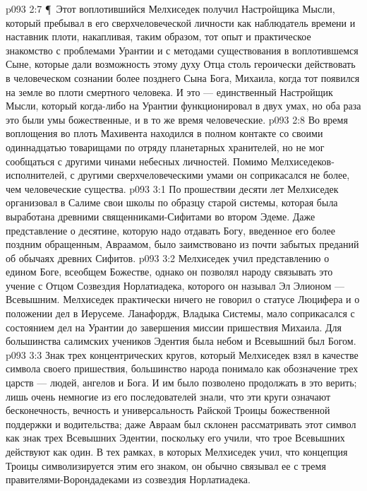 \vs p093 2:7 \P\ Этот воплотившийся Мелхиседек получил Настройщика Мысли, который пребывал в его сверхчеловеческой личности как наблюдатель времени и наставник плоти, накапливая, таким образом, тот опыт и практическое знакомство с проблемами Урантии и с методами существования в воплотившемся Сыне, которые дали возможность этому духу Отца столь героически действовать в человеческом сознании более позднего Сына Бога, Михаила, когда тот появился на земле во плоти смертного человека. И это --- единственный Настройщик Мысли, который когда\hyp{}либо на Урантии функционировал в двух умах, но оба раза это были умы божественные, и в то же время человеческие.
\vs p093 2:8 Во время воплощения во плоть Махивента находился в полном контакте со своими одиннадцатью товарищами по отряду планетарных хранителей, но не мог сообщаться с другими чинами небесных личностей. Помимо Мелхиседеков\hyp{}исполнителей, с другими сверхчеловеческими умами он соприкасался не более, чем человеческие существа.
\vs p093 3:1 По прошествии десяти лет Мелхиседек организовал в Салиме свои школы по образцу старой системы, которая была выработана древними священниками\hyp{}Сифитами во втором Эдеме. Даже представление о десятине, которую надо отдавать Богу, введенное его более поздним обращенным, Авраамом, было заимствовано из почти забытых преданий об обычаях древних Сифитов.
\vs p093 3:2 Мелхиседек учил представлению о едином Боге, всеобщем Божестве, однако он позволял народу связывать это учение с Отцом Созвездия Норлатиадека, которого он называл Эл Элионом --- Всевышним. Мелхиседек практически ничего не говорил о статусе Люцифера и о положении дел в Иерусеме. Ланафордж, Владыка Системы, мало соприкасался с состоянием дел на Урантии до завершения миссии пришествия Михаила. Для большинства салимских учеников Эдентия была небом и Всевышний был Богом.
\vs p093 3:3 Знак трех концентрических кругов, который Мелхиседек взял в качестве символа своего пришествия, большинство народа понимало как обозначение трех царств --- людей, ангелов и Бога. И им было позволено продолжать в это верить; лишь очень немногие из его последователей знали, что эти круги означают бесконечность, вечность и универсальность Райской Троицы божественной поддержки и водительства; даже Авраам был склонен рассматривать этот символ как знак трех Всевышних Эдентии, поскольку его учили, что трое Всевышних действуют как один. В тех рамках, в которых Мелхиседек учил, что концепция Троицы символизируется этим его знаком, он обычно связывал ее с тремя правителями\hyp{}Ворондадеками из созвездия Норлатиадека.
